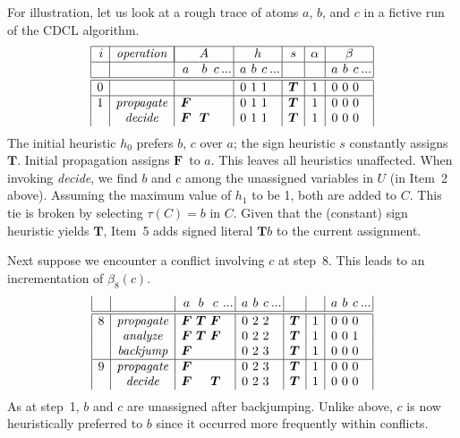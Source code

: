 \documentclass[letterpaper]{article}
\newcommand{\true}{\ensuremath{\boldsymbol{T}}}
\newcommand{\false}{\ensuremath{\boldsymbol{F}}}
\newcommand{\Tsigned}[1]{\ensuremath{\true{#1}}}\message{ *** RENAME *** }
\newcommand{\ass}{\ensuremath{A}}
\begin{document}
For illustration,
let us look at a rough trace of atoms $a$, $b$, and $c$ in a fictive run of the CDCL algorithm.
\[
\begin{array}{|r|c|c@{\ }@{\ }c@{\,}@{\,}c@{\,}r@{\,}|c@{\,}@{\,}c@{\,}@{\,}c@{\,}r@{\,}|c|c|c@{\,}@{\,}c@{\,}@{\,}c@{\,}r@{\,}|}
  \hline
  i&\mathit{operation}&
  \multicolumn{4}{|c|}{\ass}&
  \multicolumn{4}{ c|}{h}&
                       s &
                       \alpha &
  \multicolumn{4}{ c|}{\beta}\\
  \hline
   &                  &a     &b    &c&...&a&b&c   &...&     &  &a&b&c&...\\
  \hline
  \hline
  0&                  &      &     & &   &0&1&1   &   &\true&1 &0&0&0&   \\
  \hline
  1&\mathit{propagate}&\false&     & &   &0&1&1   &   &\true&1 &0&0&0&   \\
   &\mathit{decide}   &\false&\true& &   &0&1&1   &   &\true&1 &0&0&0&   
\end{array}
\]
The initial heuristic $h_0$ prefers $b$, $c$ over $a$;
the sign heuristic $s$ constantly assigns \true.
Initial propagation assigns \false\ to $a$.
This leaves all heuristics unaffected.
When invoking \textit{decide}, we find $b$ and $c$ among the unassigned variables in $U$
(in Item~2 above).
Assuming the maximum value of $h_1$ to be 1, both are added to $C$.
This tie is broken by selecting $\tau(C)=b$ in $C$.
Given that the (constant) sign heuristic yields \true,
Item~5 adds signed literal \Tsigned{b} to the current assignment.

Next suppose we encounter a conflict involving $c$ at step~8.
This leads to an incrementation of $\beta_8(c)$.
\[
\begin{array}{|r|c|c@{\,}@{\,}c@{\,}@{\,}c@{\,}r@{\,}|c@{\,}@{\,}c@{\,}@{\,}c@{\,}r@{\,}|c|c|c@{\,}@{\,}c@{\,}@{\,}c@{\,}r@{\,}|}
   &                  &a     &b    &c     &...&a&b&c   &...&     &  &a&b&c&...\\
  \hline
  \hline
  8&\mathit{propagate}&\false&\true&\false&   &0&2&2   &   &\true&1 &0&0&0&   \\
   &\mathit{analyze}  &\false&\true&\false&   &0&2&2   &   &\true&1 &0&0&1&   \\
   &\mathit{backjump} &\false&     &      &   &0&2&3   &   &\true&1 &0&0&0&   \\
  \hline
  9&\mathit{propagate}&\false&     &      &   &0&2&3   &   &\true&1 &0&0&0&   \\
   &\mathit{decide}   &\false&     &\true &   &0&2&3   &   &\true&1 &0&0&0&
\end{array}
\]
As at step~1, $b$ and $c$ are unassigned after backjumping.
Unlike above, $c$ is now heuristically preferred to $b$ since it occurred more frequently within conflicts.
\end{document}
